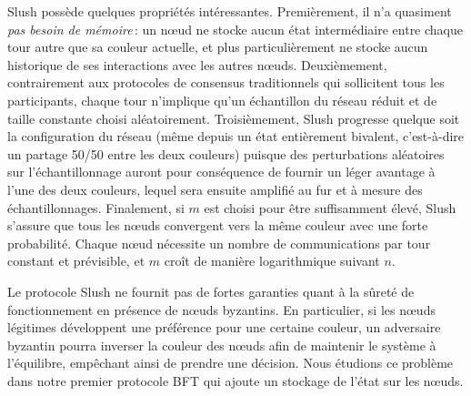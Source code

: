 \documentclass[a4,twocolumn,10pt]{article}
\newcommand{\tronly}[2]{#1}
\theoremstyle{definition}
\begin{document}

Slush possède quelques propriétés intéressantes. Premièrement, il n'a quasiment \emph{pas besoin de mémoire}\,: un nœud ne
stocke aucun état intermédiaire entre chaque tour autre que sa couleur actuelle, et plus particulièrement ne stocke
aucun historique de ses interactions avec les autres nœuds. Deuxièmement, contrairement aux protocoles de consensus
traditionnels qui sollicitent tous les participants, chaque tour n'implique qu'un échantillon du réseau réduit et de
taille constante choisi aléatoirement. Troisièmement, Slush progresse quelque soit la configuration du réseau (même
depuis un état entièrement bivalent, c'est-à-dire un partage 50/50 entre les deux couleurs) puisque des perturbations aléatoires
sur l'échantillonnage auront pour conséquence de fournir un léger avantage à l'une des deux couleurs, lequel sera ensuite
amplifié au fur et à mesure des échantillonnages.
Finalement, si $m$ est choisi pour être suffisamment élevé, Slush s'assure que tous les nœuds convergent vers la
même couleur avec une forte probabilité. Chaque nœud nécessite un nombre de communications par tour constant et
prévisible, et $m$ croît de manière logarithmique suivant $n$.

\tronly{

Le protocole Slush ne fournit pas de fortes garanties quant à la sûreté de fonctionnement en présence de nœuds
byzantins. En particulier, si les nœuds légitimes développent une préférence pour une certaine couleur, un adversaire
byzantin pourra inverser la couleur des nœuds afin de maintenir le système à l'équilibre, empêchant ainsi de prendre une
décision. Nous étudions ce problème dans notre premier protocole BFT qui ajoute un stockage de l'état sur les nœuds.
}{
Nous examinons ensuite la manière de fournir à Slush une tolérance aux comporements byzantins.
}
\end{document}

